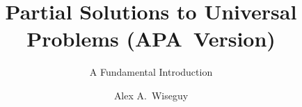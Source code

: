 \documentclass[type=bachelor,degree=engineering,theme=default,language=english,titlelanguage=english,smartquotes=true,apa=true,aiusage=detailed]{hgbthesis}
\begin{document}


\title{Partial Solutions to Universal Problems (APA~Version)}
\subtitle{A Fundamental Introduction}
\author{Alex A.\ Wiseguy}







\frontmatter                                   %

\maketitle
\tableofcontents

		
			

\mainmatter                                    %









\end{document}
